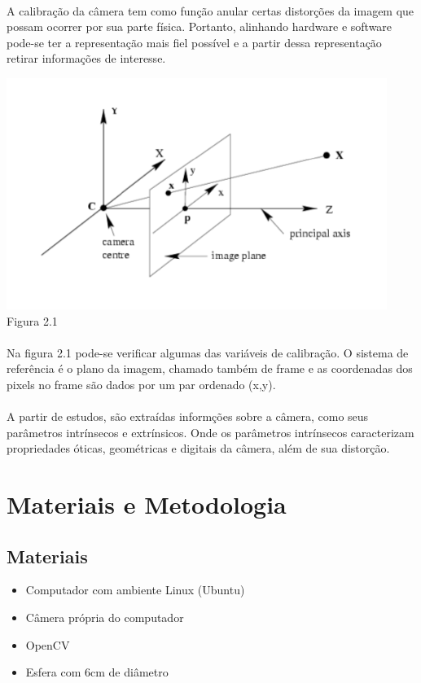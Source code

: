 \documentclass{article}
\begin{document}
		\paragraph{}
		A calibração da câmera tem como função anular certas distorções da imagem que possam ocorrer por sua parte física. Portanto, alinhando hardware e software pode-se ter a representação mais fiel possível e a partir dessa representação retirar informações de interesse.
		\begin{center}
			\includegraphics[scale=0.4]{CalibrationVariables}\\
			Figura 2.1
		\end{center}
		\paragraph{}
		Na figura 2.1 pode-se verificar algumas das variáveis de calibração. O sistema de referência é o plano da imagem, chamado também de frame e as coordenadas dos pixels no frame são dados por um par ordenado (x,y). 
		\paragraph{}
		A partir de estudos, são extraídas informções sobre a câmera, como seus parâmetros intrínsecos e extrínsicos. Onde os parâmetros intrínsecos caracterizam propriedades óticas, geométricas e digitais da câmera, além de sua distorção.
	\section{Materiais e Metodologia}
		\subsection{Materiais}
			\begin{itemize}
			\item Computador com ambiente Linux (Ubuntu)
			\item Câmera própria do computador
			\item OpenCV
			\item Esfera com 6cm de diâmetro
			\end{itemize}
\end{document}
